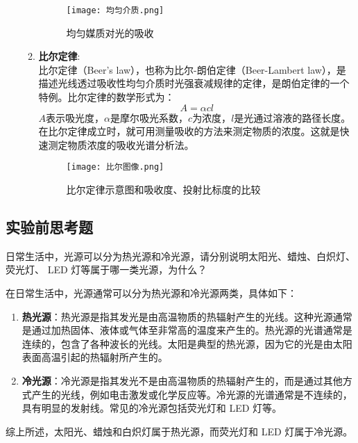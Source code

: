 \documentclass[dvipsnames, svgnames,a4paper,11pt]{article}
\begin{document}
\begin{enumerate}
\begin{enumerate}
						\begin{figure}[htbp]
							\centering
							\texttt{[image: 均匀介质.png]}
							\caption{均匀媒质对光的吸收}
							\label{fig:graph6}
						\end{figure}
						
					\item \textbf{比尔定律}:\\
					比尔定律（Beer's law），也称为比尔-朗伯定律（Beer-Lambert law），是描述光线透过吸收性均匀介质时光强衰减规律的定律，是朗伯定律的一个特例。比尔定律的数学形式为：
					\[ A = \alpha c l \]
					$A$表示吸光度，$\alpha$是摩尔吸光系数，$c$为浓度，$l$是光通过溶液的路径长度。
					在比尔定律成立时，就可用测量吸收的方法来测定物质的浓度。这就是快速测定物质浓度的吸收光谱分析法。
						
						\begin{figure}[H]
							\centering
							\texttt{[image: 比尔图像.png]}
							\caption{比尔定律示意图和吸收度、投射比标度的比较}
							\label{fig:graph7}
						\end{figure}
						
					
				\end{enumerate}
			
		\end{enumerate}
	
	
	\subsection{实验前思考题}
		\begin{question}
			日常生活中，光源可以分为热光源和冷光源，请分别说明太阳光、蜡烛、白炽灯、荧光灯、 LED 灯等属于哪一类光源，为什么？
		\end{question}
		
		在日常生活中，光源通常可以分为热光源和冷光源两类，具体如下：

\begin{enumerate}[label=\arabic*.]
    \item \textbf{热光源}：热光源是指其发光是由高温物质的热辐射产生的光线。这种光源通常是通过加热固体、液体或气体至非常高的温度来产生的。热光源的光谱通常是连续的，包含了各种波长的光线。太阳是典型的热光源，因为它的光是由太阳表面高温引起的热辐射所产生的。
    
    \item \textbf{冷光源}：冷光源是指其发光不是由高温物质的热辐射产生的，而是通过其他方式产生的光线，例如电击激发或化学反应等。冷光源的光谱通常是不连续的，具有明显的发射线。常见的冷光源包括荧光灯和 LED 灯等。
\end{enumerate}
综上所述，太阳光、蜡烛和白炽灯属于热光源，而荧光灯和 LED 灯属于冷光源。
	
\end{document}
